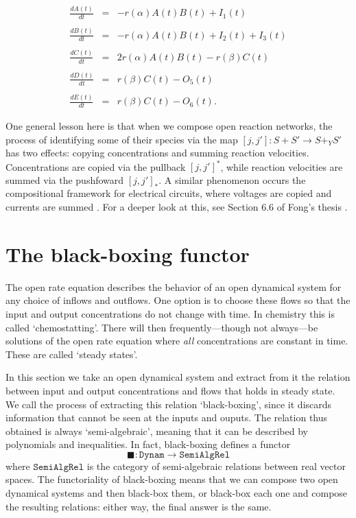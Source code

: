 \documentclass{compositionalityarticle}
\newcommand{\Dynam}{\mathtt{Dynam}}
\newcommand{\SemiAlgRel}{\mathtt{SemiAlgRel}}
\newcommand{\maps}{\colon}
\theoremstyle{compositionality}
\theoremstyle{remark}
\begin{document}
\begin{equation}
\label{eq:open_rate_3}
\begin{array}{rcl} 
\displaystyle{\frac{dA(t)}{dt}} &=& - r(\alpha) A(t) B(t)  + I_1(t)\\ \\
\displaystyle{\frac{dB(t)}{dt}} &=& - r(\alpha) A(t) B(t) + I_2(t) + I_3(t) \\ \\
\displaystyle{\frac{dC(t)}{dt}} &=& 2r(\alpha) A(t) B(t) - r(\beta) C(t)  \\ \\
\displaystyle{\frac{dD(t)}{dt}} &=& r(\beta) C(t) - O_5(t) \\ \\
\displaystyle{\frac{dE(t)}{dt}} &=& r(\beta) C(t) - O_6(t) .
\end{array}
\end{equation}

One general lesson here is that when we compose open reaction networks, the process of identifying some of their species via the map $[j,j'] \maps S + S' \to S +_Y S'$ has two effects: copying concentrations and summing reaction velocities.  Concentrations are copied via the pullback $[j,j']^*$, while reaction velocities are summed via the pushfoward $[j,j']_*$.  A similar phenomenon occurs the compositional framework for electrical circuits, where voltages are copied and currents are summed \cite{BaezFong}.  For a deeper look at this, see Section 6.6 of Fong's thesis \cite{FongThesis}.

\section{The black-boxing functor}
\label{sec:black}

The open rate equation describes the behavior of an open dynamical system for any choice of inflows and outflows.  One option is to choose these flows so that the input and output concentrations do not change with time.  In chemistry this is called `chemostatting'.    There will then frequently---though not always---be solutions of the open rate equation where \emph{all} concentrations are constant in time.   These are called `steady states'.  

In this section we take an open dynamical system and extract from it the relation between input and output concentrations and flows that holds in steady state.  We call the process of extracting this relation `black-boxing', since it discards information that cannot be seen at the inputs and ouputs.  The relation thus obtained is always `semi-algebraic', meaning that it can be described by polynomials and inequalities.  In fact, black-boxing defines a functor 
\[        \blacksquare \maps \Dynam \to \SemiAlgRel \]
where $\SemiAlgRel$ is the category of semi-algebraic relations between real vector spaces.    The functoriality of black-boxing means that we can compose two open dynamical systems and then black-box them, or black-box each one and compose the resulting relations: either way, the final answer is the same.   
\end{document}

